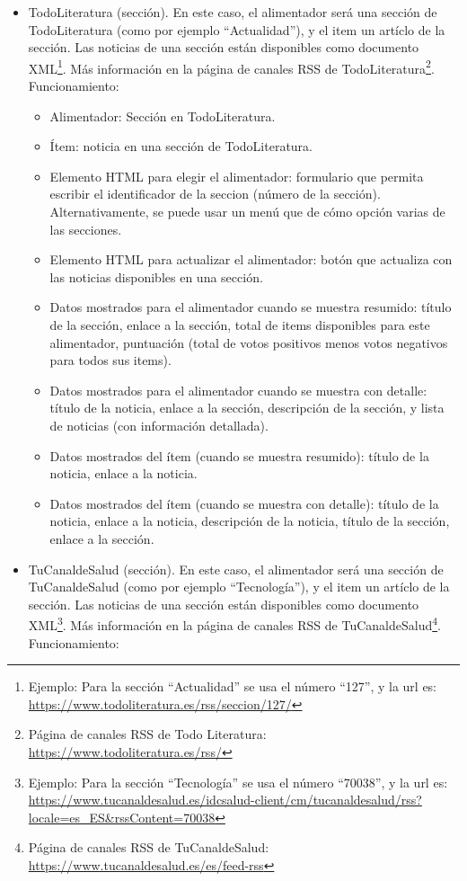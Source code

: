 \begin{itemize}
\item TodoLiteratura (sección). En este caso, el alimentador será una sección de TodoLiteratura (como por ejemplo ``Actualidad''), y el item un artíclo de la sección. Las noticias de una sección están disponibles como documento XML\footnote{Ejemplo: Para la sección ``Actualidad'' se usa el número ``127'', y la url es: \\ \url{https://www.todoliteratura.es/rss/seccion/127/}}. Más información en la página de canales RSS de TodoLiteratura\footnote{Página de canales RSS de Todo Literatura: \\ \url{https://www.todoliteratura.es/rss/}}. Funcionamiento:

  \begin{itemize}
  \item Alimentador: Sección en TodoLiteratura.
  \item Ítem: noticia en una sección de TodoLiteratura.
  \item Elemento HTML para elegir el alimentador: formulario que permita escribir el identificador de la seccion (número de la sección). Alternativamente, se puede usar un menú que de cómo opción varias de las secciones.
  \item Elemento HTML para actualizar el alimentador: botón que actualiza con las noticias disponibles en una sección.
  \item Datos mostrados para el alimentador cuando se muestra resumido: título de la sección, enlace a la sección, total de items disponibles para este alimentador, puntuación (total de votos positivos menos votos negativos para todos sus items).
  \item Datos mostrados para el alimentador cuando se muestra con detalle: título de la noticia, enlace a la sección, descripción de la sección, y lista de noticias (con información detallada).
  \item Datos mostrados del ítem (cuando se muestra resumido): título de la noticia, enlace a la noticia.
  \item Datos mostrados del ítem (cuando se muestra con detalle): título de la noticia, enlace a la noticia, descripción de la noticia, título de la sección, enlace a la sección.
  \end{itemize}

\item TuCanaldeSalud (sección). En este caso, el alimentador será una sección de TuCanaldeSalud (como por ejemplo ``Tecnología''), y el item un artíclo de la sección. Las noticias de una sección están disponibles como documento XML\footnote{Ejemplo: Para la sección ``Tecnología'' se usa el número ``70038'', y la url es: \\ \url{https://www.tucanaldesalud.es/idcsalud-client/cm/tucanaldesalud/rss?locale=es_ES&rssContent=70038}}. Más información en la página de canales RSS de TuCanaldeSalud\footnote{Página de canales RSS de TuCanaldeSalud: \\ \url{https://www.tucanaldesalud.es/es/feed-rss}}. Funcionamiento:


\end{itemize}

